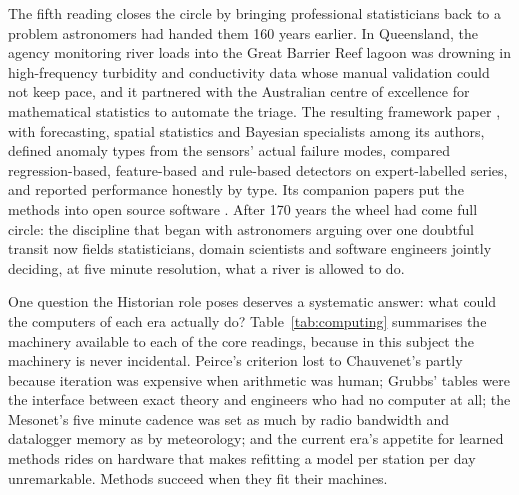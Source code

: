 The fifth reading closes the circle by bringing professional statisticians
back to a problem astronomers had handed them 160 years earlier. In
Queensland, the agency monitoring river loads into the Great Barrier Reef
lagoon was drowning in high-frequency turbidity and conductivity data whose
manual validation could not keep pace, and it partnered with the Australian
centre of excellence for mathematical statistics to automate the triage. The
resulting framework paper \citep{leigh2019}, with forecasting, spatial
statistics and Bayesian specialists among its authors, defined anomaly types
from the sensors' actual failure modes, compared regression-based,
feature-based and rule-based detectors on expert-labelled series, and
reported performance honestly by type. Its companion papers put the methods
into open source software \citep{talagala2019}. After 170 years the wheel
had come full circle: the discipline that began with astronomers arguing
over one doubtful transit now fields statisticians, domain scientists and
software engineers jointly deciding, at five minute resolution, what a river
is allowed to do.

One question the Historian role poses deserves a systematic answer: what
could the computers of each era actually do? Table~\ref{tab:computing}
summarises the machinery available to each of the core readings, because in
this subject the machinery is never incidental. Peirce's criterion lost to
Chauvenet's partly because iteration was expensive when arithmetic was
human; Grubbs' tables were the interface between exact theory and engineers
who had no computer at all; the Mesonet's five minute cadence was set as
much by radio bandwidth and datalogger memory as by meteorology; and the
current era's appetite for learned methods rides on hardware that makes
refitting a model per station per day unremarkable. Methods succeed when
they fit their machines.

